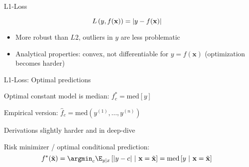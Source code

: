\documentclass[11pt,compress,t,notes=noshow, xcolor=table]{beamer}
\begin{document}
\begin{frame}{L1-Loss}

$$
L\left(y, f(\mathbf{x})\right) = \left|y-f(\mathbf{x})\right|
$$

\begin{itemize}
\item More robust than $L2$, outliers in $y$ are less problematic
\item Analytical properties: convex, not differentiable for $y = f(\bm{x})$ (optimization becomes harder)
\end{itemize}

\vfill


\end{frame}


\begin{framei}[sep=L]{L1-Loss: Optimal predictions}

\item Optimal constant model is median: 
$f_{c}^{\ast} = \text{med} [y]$

\item Empirical version: $\hat{f}_c = \text{med}(y^{(1)}, \ldots, y^{(n)}) $  

\item Derivations slightly harder and in deep-dive

\item Risk minimizer / optimal conditional prediction:
$$f^{\ast}(\xtil) = \argmin_c \E_{y|x}\left[|y - c| ~|~ \xv = \xtil\right]= \text{med} \left[y ~|~ \xv = \xtil \right]
$$

\end{framei}



\endlecture
\end{document}
